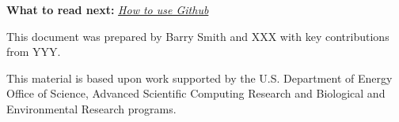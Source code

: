 \documentclass[]{article}
\begin{document}
\textbf{What to read next:}
\href{https://docs.google.com/document/d/1sfVMcCNwJIoUpVSyJ6HEmi3Dx3NhCpR_7BOz5cfhnAg/edit}{\emph{How
to use Github}}

This document was prepared by Barry Smith and XXX with key contributions
from YYY.

This material is based upon work supported by the U.S. Department of
Energy Office of Science, Advanced Scientific Computing Research and
Biological and Environmental Research programs.
\end{document}
